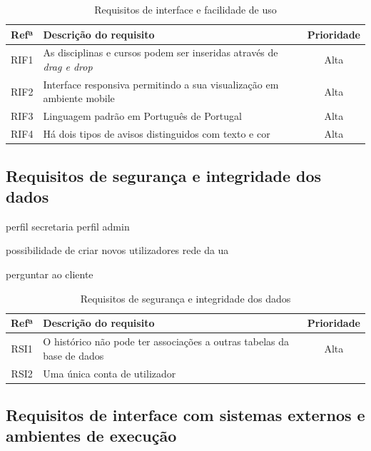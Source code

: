 \documentclass[11pt, twoside]{report}
\begin{document}
	
	\begin{table}[H]
	\caption{Requisitos de interface e facilidade de uso}
	
	\begin{center}
		\begin{tabularx}{\textwidth}{|c|X|c|}
			\hline
			\textbf{Refª }	& \textbf{Descrição do requisito} & \textbf{Prioridade} \\
			\hline
			RIF1 & As disciplinas e cursos podem ser inseridas através de \textit{drag e drop} &Alta\\
			\hline
			RIF2 & Interface responsiva permitindo a sua visualização em ambiente mobile &Alta\\
			\hline
			RIF3 & Linguagem padrão em Português de Portugal &Alta\\
			\hline
			RIF4 & Há dois tipos de avisos distinguidos com texto e cor &Alta\\
			\hline
		\end{tabularx}
		\label{requisitosdeinterface}
	\end{center}
	\end{table}

	\subsection{Requisitos de segurança e integridade dos dados}
	
	perfil secretaria 
perfil admin

possibilidade de criar novos utilizadores
rede da ua

perguntar ao cliente
\begin{table}[H]	
	\caption{Requisitos de segurança e integridade dos dados}
	
	
	\begin{center}
		\begin{tabularx}{\textwidth}{|c|X|c|}
			\hline
			\textbf{Refª }	& \textbf{Descrição do requisito} & \textbf{Prioridade} \\
			\hline
			RSI1 &O histórico não pode ter associações a outras tabelas da base de dados  &Alta\\
			\hline
			RSI2 & Uma única conta de utilizador&\\
			\hline
		\end{tabularx}
		\label{requisitosdeseguranca}
	\end{center}
\end{table}


	\subsection{Requisitos de interface com sistemas externos e ambientes de execução}
	
\end{document}
